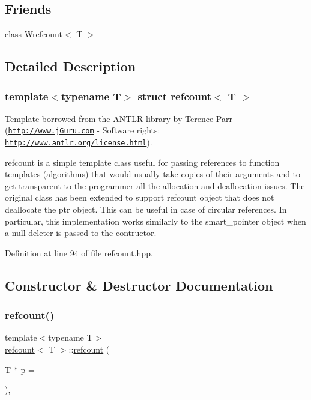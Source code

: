 \subsection*{Friends}
\begin{DoxyCompactItemize}
\item 
class \hyperlink{structrefcount_a94a77cab99e5f70bb9abded7f88d984e}{Wrefcount$<$ T $>$}
\end{DoxyCompactItemize}


\subsection{Detailed Description}
\subsubsection*{template$<$typename T$>$\newline
struct refcount$<$ T $>$}

Template borrowed from the A\+N\+T\+LR library by Terence Parr (\href{http://www.jGuru.com}{\tt http\+://www.\+j\+Guru.\+com} -\/ Software rights\+: \href{http://www.antlr.org/license.html}{\tt http\+://www.\+antlr.\+org/license.\+html}). 

{\ttfamily refcount} is a simple template class useful for passing references to function templates (algorithms) that would usually take copies of their arguments and to get transparent to the programmer all the allocation and deallocation issues. The original class has been extended to support refcount object that does not deallocate the ptr object. This can be useful in case of circular references. In particular, this implementation works similarly to the smart\+\_\+pointer object when a null deleter is passed to the contructor. 

Definition at line 94 of file refcount.\+hpp.



\subsection{Constructor \& Destructor Documentation}
\mbox{\label{structrefcount_aa9379f6f8bca4efb13375c07b9f37079}} 
\subsubsection{\texorpdfstring{refcount()}{refcount()}\hspace{0.1cm}{\footnotesize\ttfamily [1/3]}}
{\footnotesize\ttfamily template$<$typename T$>$ \\
\hyperlink{structrefcount}{refcount}$<$ T $>$\+::\hyperlink{structrefcount}{refcount} (\begin{DoxyParamCaption}\item[{T $\ast$}]{p = {} }\end{DoxyParamCaption})\hspace{0.3cm}{\ttfamily [inline]}, {\ttfamily [explicit]}}



